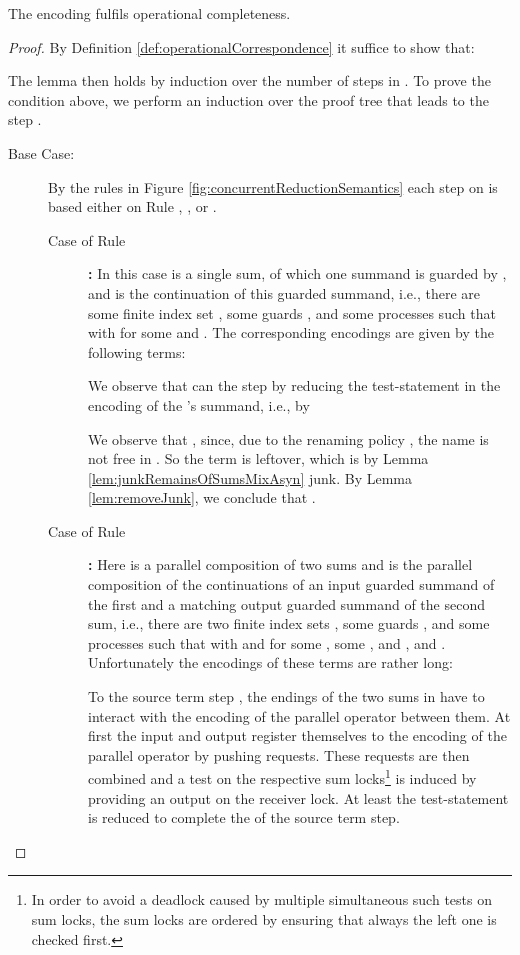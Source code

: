 \documentclass[]{llncs}
\begin{document}
\begin{lemma} \label{lem:operationalCompletenessMixAsyn}
	The encoding  fulfils operational completeness.
\end{lemma}

\begin{proof}
	By Definition \ref{def:operationalCorrespondence} it suffice to show that:
	
	The lemma then holds by induction over the number of steps in . To prove the condition above, we perform an induction over the proof tree that leads to the step .
	\begin{description}
		\item[Base Case:] By the rules in Figure \ref{fig:concurrentReductionSemantics} each step on  is based either on Rule , , or .
			\begin{description}
				\item[Case of Rule] \textbf{:} In this case  is a single sum, of which one summand is guarded by , and  is the continuation of this  guarded summand, i.e., there are some finite index set , some guards , and some processes  such that  with  for some  and . The corresponding encodings are given by the following terms:
					
					We observe that  can \simulate the step  by reducing the test-statement in the encoding of the 's summand, i.e., by
					
					We observe that , since, due to the renaming policy , the name  is not free in . So the term  is leftover, which is by Lemma \ref{lem:junkRemainsOfSumsMixAsyn} junk. By Lemma \ref{lem:removeJunk}, we conclude that .
				\item[Case of Rule] \textbf{:} Here  is a parallel composition of two sums and  is the parallel composition of the continuations of an input guarded summand of the first and a matching output guarded summand of the second sum, i.e., there are two finite index sets , some guards , and some processes  such that  with  and  for some , some , and , and . Unfortunately the encodings of these terms are rather long:
					
					To \simulate the source term step , the endings of the two sums in  have to interact with the encoding of the parallel operator between them. At first the input and output register themselves to the encoding of the parallel operator by pushing requests. These requests are then combined and a test on the respective sum locks\footnote{In order to avoid a deadlock caused by multiple simultaneous such tests on sum locks, the sum locks are ordered by ensuring that always the left one is checked first.} is induced by providing an output on the receiver lock. At least the test-statement is reduced to complete the \simulation of the source term step.
					

\end{description}
\end{description}
\end{proof}
\end{document}
